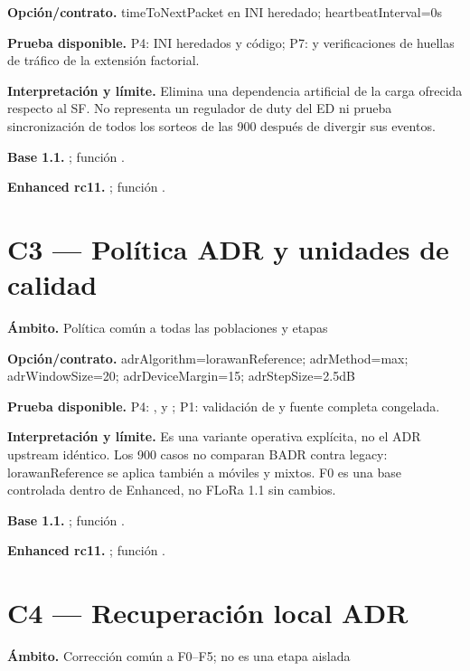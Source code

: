 \documentclass[10pt,a4paper]{article}
\begin{document}
\textbf{Opción/contrato.} timeToNextPacket en INI heredado; heartbeatInterval=0s

\textbf{Prueba disponible.} P4: INI heredados y código; P7:  y verificaciones de huellas de tráfico de la extensión factorial.

\textbf{Interpretación y límite.} Elimina una dependencia artificial de la carga ofrecida respecto al SF. No representa un regulador de duty del ED ni prueba sincronización de todos los sorteos de las 900 después de divergir sus eventos.

\textbf{Base 1.1.} ; función .\par
\textbf{Enhanced rc11.} ; función .\par
\section*{C3 — Política ADR y unidades de calidad}
\textbf{Ámbito.} Política común a todas las poblaciones y etapas

\textbf{Opción/contrato.} adrAlgorithm=lorawanReference; adrMethod=max; adrWindowSize=20; adrDeviceMargin=15; adrStepSize=2.5dB

\textbf{Prueba disponible.} P4: ,  y ; P1: validación de  y fuente completa congelada.

\textbf{Interpretación y límite.} Es una variante operativa explícita, no el ADR upstream idéntico. Los 900 casos no comparan BADR contra legacy: lorawanReference se aplica también a móviles y mixtos. F0 es una base controlada dentro de Enhanced, no FLoRa 1.1 sin cambios.

\textbf{Base 1.1.} ; función .\par
\textbf{Enhanced rc11.} ; función .\par
\section*{C4 — Recuperación local ADR}
\textbf{Ámbito.} Corrección común a F0–F5; no es una etapa aislada
\end{document}
